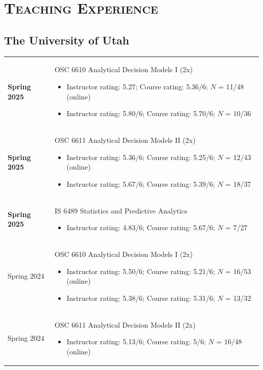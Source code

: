 \documentclass[11pt]{article}
\begin{document}
	\section*{\textbf{\textsc{Teaching Experience}}}
	\subsection*{The University of Utah}%
	\begin{longtable}{p{2.5cm}p{14cm}}
			\textbf{Spring 2025}  & OSC 6610 Analytical Decision Models I (2x)
		\begin{itemize}[label={$\circ\;$}]
			\item Instructor rating: 5.27; Course rating: 5.36/6; $N$ = 11/48 (online)
			\item  Instructor rating: 5.80/6; Course rating: 5.70/6; $N$ = 10/36
		\end{itemize}
		\\
		\textbf{Spring 2025} & OSC 6611  Analytical Decision Models II (2x)
		\begin{itemize}[label={$\circ\;$}]
			\item Instructor rating: 5.36/6; Course rating: 5.25/6; $N$ = 12/43  (online)
			\item Instructor rating: 5.67/6; Course rating: 5.39/6; $N$ = 18/37
		\end{itemize}
		\\
		\textbf{Spring 2025 }& IS 6489 Statistics and Predictive Analytics
		\begin{itemize}[label={$\circ\;$}]
			\item Instructor rating: 4.83/6; Course rating: 5.67/6; $N$ = 7/27
		\end{itemize}
		\\
		Spring 2024  & OSC 6610 Analytical Decision Models I (2x)
			\begin{itemize}[label={$\circ\;$}]
			\item Instructor rating: 5.50/6; Course rating: 5.21/6; $N$ = 16/53 (online)
			\item  Instructor rating: 5.38/6; Course rating: 5.31/6; $N$ = 13/32
		\end{itemize}\\
		Spring 2024 & OSC 6611  Analytical Decision Models II (2x)
		\begin{itemize}[label={$\circ\;$}]
			\item Instructor rating: 5.13/6; Course rating: 5/6; $N$ = 16/48  (online)

\end{itemize}
\end{longtable}
\end{document}
